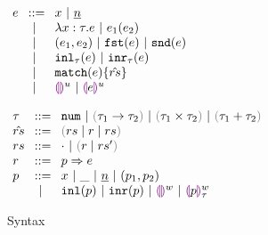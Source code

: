 
\begin{figure}[ht]
    \centering
    \begin{minipage}{.5\linewidth}
  $\arraycolsep=4pt\begin{array}{lll}
    e & ::= &
      x ~\vert~
      \hnum{n} \\
      & ~\vert~ &
      \hlam{x}{\tau}{e} ~\vert~
      \hap{e_1}{e_2} \\
      & ~\vert~ &
      \hpair{e_1}{e_2} ~\vert~
      \hfst{e} ~\vert~ \hsnd{e} \\
      & ~\vert~ &
      \hinl{\tau}{e} ~\vert~
      \hinr{\tau}{e} \\
      & ~\vert~ &
      \hmatch{e}{\hat{rs}} \\
      & ~\vert~ &
      \hehole{u} ~\vert~
      \hhole{e}{u} \\
    \end{array}$
    \end{minipage}%
    \begin{minipage}{.5\linewidth}
  $\arraycolsep=4pt\begin{array}{lll}
    \tau & ::= &
      \tnum ~\vert~
      \tarr{\tau_1}{\tau_2} ~\vert~
      \tprod{\tau_1}{\tau_2} ~\vert~
      \tsum{\tau_1}{\tau_2} \\
    \hat{rs} & ::= &
      \zrulsP{rs}{r}{rs} \\
    rs & ::= &
      \cdot ~\vert~ \hrulesP{r}{rs'} \\
    r & ::= &
      \hrul{p}{e} \\
    p & ::= &
      x ~\vert~
      \_ ~\vert~
      \hnum{n} ~\vert~
      \hpair{p_1}{p_2} \\
      & ~\vert~ &
      \hinlp{p} ~\vert~
      \hinrp{p} ~\vert~
      \heholep{w} ~\vert~
      \hholep{p}{w}{\tau}
    \end{array}$
    \end{minipage}
\caption{Syntax}
\label{fig:syntax}
\end{figure}
